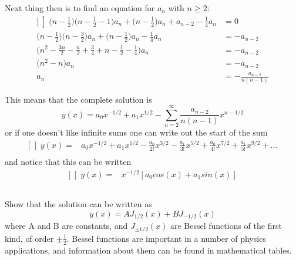 \documentclass[a4paper,12pt]{article}
\begin{document}
Next thing then is to find an equation for $a_n$ with $n \ge 2$:
\begin{equation*}
\begin{aligned}[\left]
\bigg(n-\frac{1}{2}\bigg)\bigg(n-\frac{1}{2}-1\bigg)a_n + \bigg(n-\frac{1}{2}\bigg)a_n +a_{n-2} -\frac{1}{4}a_n &= 0\\
\bigg(n-\frac{1}{2}\bigg)\bigg(n-\frac{3}{2}\bigg)a_n + \bigg(n-\frac{1}{2}\bigg)a_n -\frac{1}{4}a_n &= -a_{n-2}\\
\bigg(n^2 -\frac{3n}{2} -\frac{n}{2} +\frac{3}{4} + n - \frac{1}{2} - \frac{1}{4}\bigg)a_n &= -a_{n-2}\\
\bigg(n^2 - n\bigg)a_n &= -a_{n-2}\\
a_n &= -\frac{a_{n-2}}{n(n - 1)}
\end{aligned}
\end{equation*}

This means that the complete solution is
\begin{equation}
y(x) = a_0x^{-1/2} +a_1x^{1/2} - \sum_{n=2}^{\infty}\frac{a_{n-2}}{n(n-1)}x^{n-1/2}
\end{equation}
or if one doesn't like infinite sums one can write out the start of the sum
\begin{equation*}
\begin{aligned}[\left]
y(x) =& a_0x^{-1/2} +a_1x^{1/2}-\frac{a_0}{2!}x^{3/2}-\frac{a_1}{3!}x^{5/2} +\frac{a_0}{4!}x^{7/2} + \frac{a_1}{5!}x^{9/2} + ...\\
\end{aligned}
\end{equation*}
and notice that this can be written
\begin{equation}
\begin{aligned}[\left]
y(x) =& x^{-1/2}[a_0 cos(x) + a_1 sin(x)]
\end{aligned}
\end{equation}

\subsection{}
Show that the solution can be written as
\begin{equation}
 y(x) = AJ_{1/2}(x) + BJ_{-1/2}(x) 
\end{equation}
where A and B are constants, and $J_{\pm1/2}(x)$ are Bessel functions of the first kind, of order $\pm\frac{1}{2}$. Bessel functions are important in a number of physics applications, and information about them can be found in mathematical tables.
\end{document}

